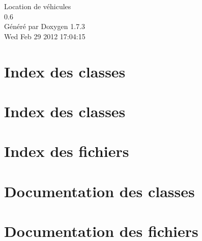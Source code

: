 \documentclass[a4paper]{book}
\begin{document}
\hypersetup{pageanchor=false}
\begin{titlepage}
\vspace*{7cm}
\begin{center}
{\Large Location de véhicules \\[1ex]\large 0.6 }\\
\vspace*{1cm}
{\large Généré par Doxygen 1.7.3}\\
\vspace*{0.5cm}
{\small Wed Feb 29 2012 17:04:15}\\
\end{center}
\end{titlepage}
\clearemptydoublepage
{}
\tableofcontents
\clearemptydoublepage
{}
\hypersetup{pageanchor=true}
\chapter{Index des classes}

\chapter{Index des classes}

\chapter{Index des fichiers}

\chapter{Documentation des classes}












\chapter{Documentation des fichiers}











\printindex
\end{document}
